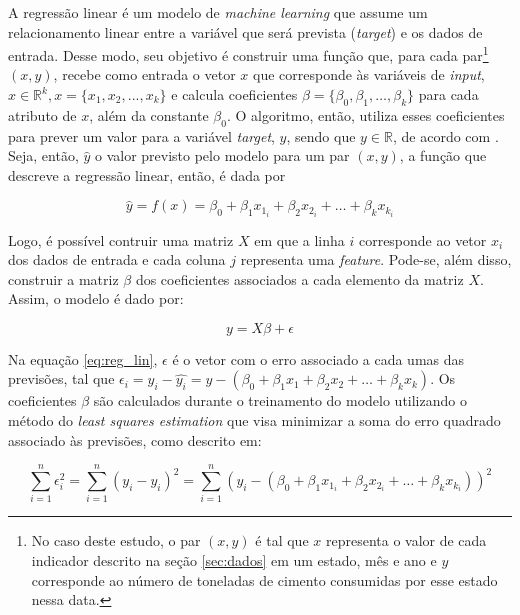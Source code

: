 A regressão linear é um modelo de \textit{machine learning} que assume um relacionamento
linear entre a variável que será prevista (\textit{target}) e os dados de entrada.
Desse modo, seu objetivo é construir uma 
função que, para cada par\footnote{No
caso deste estudo, o par  $(x,y)$ é tal que 
$x$ representa o valor de cada
indicador descrito na seção \ref{sec:dados} em um estado, mês e ano e 
$y$ corresponde ao número de toneladas de cimento consumidas
por esse estado nessa data.} $(x,y)$, recebe como
entrada o vetor $x$ que corresponde às variáveis de \textit{input},
$x \in \mathbb{R}^k , x=\{x_1, x_2, ..., x_k\}$ e calcula coeficientes
$\beta = \{\beta_0, \beta_1, \dots, \beta_k\}$ para cada atributo de $x$,
além da constante $\beta_0$. O algoritmo, então, utiliza esses coeficientes para
prever um valor para a variável \textit{target}, $y$, sendo 
que $y \in \mathbb{R}$, de acordo com \citet{forecasting}. Seja,
então, $\hat{y}$ o valor previsto pelo modelo para um 
par $(x, y)$, a função que descreve a 
regressão linear, então, é dada por

\begin{equation}
  \hat{y} = f(x) = \beta_0 + \beta_1 x_{1_i} + \beta_2 x_{2_i} + \dots + \beta_k x_{k_i} 
\end{equation}

Logo, é possível contruir uma matriz $X$ em que a linha $i$
corresponde ao vetor $x_i$ dos dados de entrada e 
cada coluna $j$ representa uma \textit{feature}. Pode-se, 
além disso, construir a matriz $\beta$ dos coeficientes associados 
a cada elemento da matriz $X$. Assim, o modelo
é dado por:

\begin{equation}
  \label{eq:reg_lin}
  y = X\beta + \epsilon
\end{equation}

Na equação \ref{eq:reg_lin}, $\epsilon$ é o vetor com o erro associado a cada umas 
das previsões, tal que $\epsilon_i = y_i - \hat{y_i} = y - (\beta_0 + \beta_1 x_1 + \beta_2 x_2 + \dots + \beta_k x_k )$.
Os coeficientes $\beta$ são calculados durante o treinamento 
do modelo utilizando o método do \textit{least squares estimation}
que visa minimizar a soma do erro quadrado associado às previsões, 
como descrito em:

\begin{equation}
  \sum_{i=1}^{n} \epsilon_i^2 = \sum_{i=1}^{n} (y_i - \hat{y_i})^2 = 
  \sum_{i=1}^{n} (y_i - (\beta_0 + \beta_1 x_{1_i} + \beta_2 x_{2_i} + \dots + \beta_k x_{k_i} ))^2
\end{equation}

